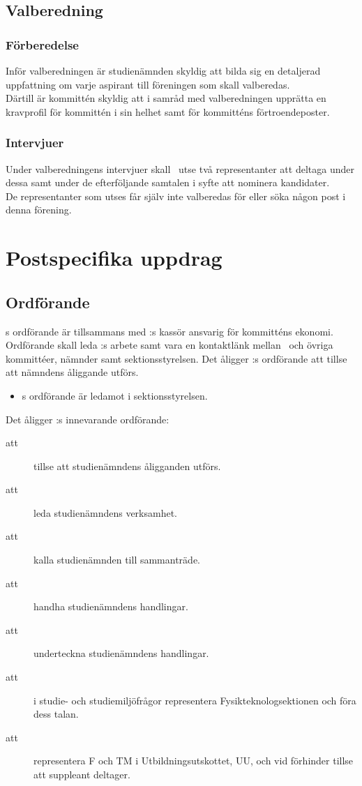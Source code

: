 \subsection{Valberedning}
\subsubsection{Förberedelse}
Inför valberedningen är studienämnden skyldig att bilda sig en detaljerad uppfattning om varje aspirant till föreningen som skall valberedas.\\
Därtill är kommittén skyldig att i samråd med valberedningen upprätta en kravprofil för kommittén i sin helhet samt för kommitténs förtroendeposter.

\subsubsection{Intervjuer}
Under valberedningens intervjuer skall \forening \ utse två representanter att deltaga under dessa samt under de efterföljande samtalen i syfte att nominera kandidater.\\
De representanter som utses får själv inte valberedas för eller söka någon post i denna förening.

\section{Postspecifika uppdrag}

\subsection{Ordförande}
\forening s ordförande är tillsammans med \forening:s kassör ansvarig för kommitténs ekonomi. Ordförande skall leda \forening:s arbete samt vara en kontaktlänk mellan \forening \ och övriga kommittéer, nämnder samt sektionsstyrelsen. Det åligger \forening:s ordförande att tillse att nämndens åliggande utförs.\\

\begin{itemize}
\item \forening s ordförande är ledamot i sektionsstyrelsen.
\end{itemize}

Det åligger \forening :s innevarande ordförande:
\begin{description}
    \item[att] tillse att studienämndens åligganden utförs. 
    \item[att] leda studienämndens verksamhet.
    \item[att] kalla studienämnden till sammanträde.
    \item[att] handha studienämndens handlingar.
    \item[att] underteckna studienämndens handlingar.
    \item[att] i studie- och studiemiljöfrågor representera Fysikteknologsektionen och föra dess talan.
    \item[att] representera F och TM i Utbildningsutskottet, UU, och vid förhinder tillse att suppleant deltager.
\end{description}
    

